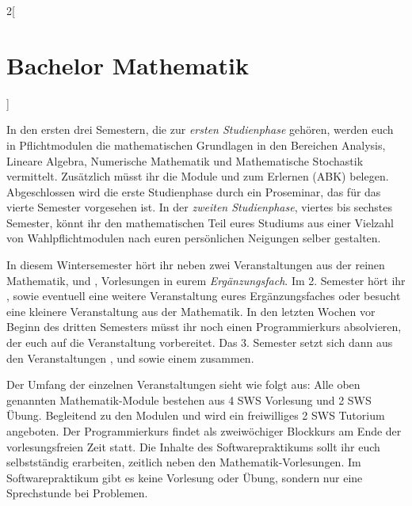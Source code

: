 \begin{multicols}{2}[\section{Bachelor Mathematik}]

In den ersten drei Semestern, die zur \emph{ersten Studienphase} gehören,
werden euch in Pflichtmodulen die mathematischen Grundlagen in den Bereichen
Analysis, Lineare Algebra, Numerische Mathematik und Mathematische Stochastik
vermittelt. Zusätzlich müsst ihr die Module  und
 zum Erlernen  (ABK) belegen. Abgeschlossen wird die erste Studienphase durch ein
Proseminar, das für das vierte Semester vorgesehen ist.  In der \emph{zweiten
Studienphase}, viertes bis sechstes Semester, könnt ihr den mathematischen Teil
eures Studiums aus einer Vielzahl von Wahlpflichtmodulen nach euren
persönlichen Neigungen selber gestalten. 

In diesem Wintersemester hört ihr neben zwei Veranstaltungen aus der reinen
Mathematik,  und , Vorlesungen in eurem \emph{Ergänzungsfach}. Im 2. Semester hört
ihr , 
sowie eventuell eine weitere Veranstaltung eures Ergänzungsfaches oder besucht
eine kleinere Veranstaltung aus der Mathematik. In den letzten Wochen vor
Beginn des dritten Semesters müsst ihr noch einen Programmierkurs absolvieren,
der euch auf die Veranstaltung  vorbereitet. Das
3.  Semester setzt sich dann aus den Veranstaltungen ,
 und  sowie einem
 zusammen. 

Der Umfang der einzelnen Veranstaltungen sieht wie folgt aus: Alle oben
genannten Mathematik-Module bestehen aus 4 SWS Vorlesung und 2 SWS Übung.
Begleitend zu den Modulen  und  wird ein freiwilliges 2 SWS Tutorium angeboten. Der
Programmierkurs findet als zweiwöchiger Blockkurs am Ende der vorlesungsfreien
Zeit statt. Die Inhalte des Softwarepraktikums sollt ihr euch selbstständig
erarbeiten, zeitlich neben den Mathematik-Vorlesungen. Im Softwarepraktikum
gibt es keine Vorlesung oder Übung, sondern nur eine Sprechstunde bei
Problemen.


\end{multicols}
